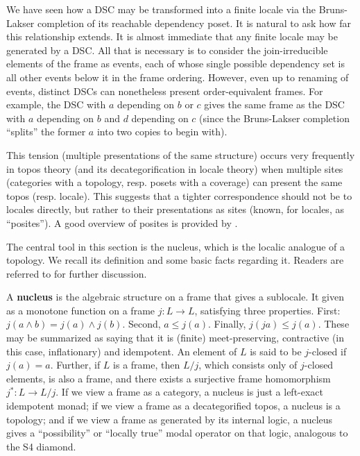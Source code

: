 \documentclass[a4paper,USenglish,cleveref, autoref, thm-restate,authorcolumns]{lipics-v2019}
\begin{document}
We have seen how a DSC may be transformed into a finite locale via the Bruns-Lakser completion of its reachable dependency poset. It is natural to ask how far this relationship extends. It is almost immediate that any finite locale may be generated by a DSC. All that is necessary is to consider the join-irreducible elements of the frame as events, each of whose single possible dependency set is all other events below it in the frame ordering. However, even up to renaming of events, distinct DSCs can nonetheless present order-equivalent frames. For example, the DSC with \(a\) depending on \(b\) or \(c\) gives the same frame as the DSC with \(a\) depending on \(b\) and \(d\) depending on \(c\) (since the Bruns-Lakser completion ``splits'' the former \(a\) into two copies to begin with). 

This tension (multiple presentations of the same structure) occurs very frequently in topos theory (and its decategorification in locale theory) when multiple sites (categories with a topology, resp. posets with a coverage) can present the same topos (resp. locale). This suggests that a tighter correspondence should not be to locales directly, but rather to their presentations as sites (known, for locales, as ``posites''). A good overview of posites is provided by \cite{schultz2017temporal}.

The central tool in this section is the nucleus, which is the localic analogue of a topology. We recall its definition and some basic facts regarding it. Readers are referred to \cite{johnstone1982stone, vickers1996topology} for further discussion.

A \textbf{nucleus} is the algebraic structure on a frame that gives a sublocale. It given as a monotone function on a frame \(j : L \rightarrow L\), satisfying three properties. First: \(j(a \wedge b) = j(a) \wedge j(b)\). Second, \(a \le j(a)\). Finally, \(j(ja) \le j(a)\). These may be summarized as saying that it is (finite) meet-preserving, contractive (in this case, inflationary) and idempotent. An element of \(L\) is said to be \(j\)-closed if \(j(a)=a\). Further, if \(L\) is a frame, then \(L/j\), which consists only of \(j\)-closed elements, is also a frame, and there exists a surjective frame homomorphism \(j^* : L \rightarrow L/j\). If we view a frame as a category, a nucleus is just a left-exact idempotent monad; if we view a frame as a decategorified topos, a nucleus is a topology; and if we view a frame as generated by its internal logic, a nucleus gives a ``possibility'' or ``locally true'' modal operator on that logic, analogous to the S4 diamond.
\end{document}

